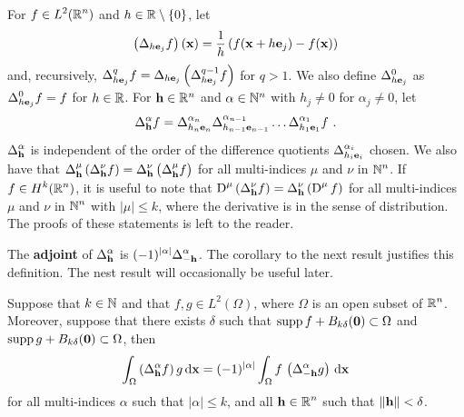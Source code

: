For $\displaystyle f\in L^2(\mathbb{R}^n)$ and $h \in \mathbb{R}\setminus \{0\}$, let
\begin{equation}  \label{ell_diffQuot}
\left(\Delta_{h\mathbf{e}_j} f\right)(\mathbf{x}) =
\frac{1}{h} \left( f(\mathbf{x} + h\mathbf{e}_j) -f(\mathbf{x}) \right)
\end{equation}
and, recursively,
$\displaystyle \Delta_{h\mathbf{e}_j}^q f =
\Delta_{h\mathbf{e}_j} \left(\Delta_{h\mathbf{e}_j}^{q-1} f \right)$
for $q>1$.
We also define $\Delta^0_{h\mathbf{e}_j}$ as
$\displaystyle \Delta^0_{h\mathbf{e}_j} f = f$ for $h \in \mathbb{R}$.
For $\mathbf{h} \in \mathbb{R}^n$ and $\alpha \in \mathbb{N}^n$ with $h_j \neq 0$ for
$\alpha_j \neq 0$, let
\[
\Delta_{\mathbf{h}}^\alpha f = \Delta_{h_n\mathbf{e}_n}^{\alpha_n} 
\Delta_{h_{n-1}\mathbf{e}_{n-1}}^{\alpha_{n-1}} \ldots
\Delta_{h_1\mathbf{e}_1}^{\alpha_1} f \ .
\]
$\displaystyle \Delta_{\mathbf{h}}^\alpha$ is independent of the order of the
difference quotients $\displaystyle \Delta_{h_i\mathbf{e}_i}^{\alpha_i}$ chosen.
We also have that
$\displaystyle \Delta_{\mathbf{h}}^\mu \left( \Delta_{\mathbf{h}}^\nu f\right)
= \Delta_{\mathbf{h}}^\nu \left( \Delta_{\mathbf{h}}^\mu f\right)$ for all
multi-indices $\mu$ and $\nu$ in $\displaystyle \mathbb{N}^n$.
If $\displaystyle f \in H^k(\mathbb{R}^n)$, it is useful to note that
$\displaystyle \operatorname{D}^\mu\left( \Delta_{\mathbf{h}}^\nu f \right)
= \Delta_{\mathbf{h}}^\nu \left(\operatorname{D}^\mu f \right)$ for all
multi-indices $\mu$ and $\nu$ in $\displaystyle \mathbb{N}^n$ with
$|\mu|\leq k$, where the
derivative is in the sense of distribution.  The proofs of these
statements is left to the reader.

The {\bfseries adjoint} of $\displaystyle \Delta_{\mathbf{h}}^\alpha$ is
$\displaystyle (-1)^{|\alpha|}\Delta_{-\mathbf{h}}^\alpha$.  The
corollary to the next result justifies this definition.  The nest
result will occasionally be useful later.

\begin{prop} \label{DiffQuotientAdjoint}
Suppose that $k \in \mathbb{N}$ and that $\displaystyle f,g \in L^2(\Omega)$,
where $\Omega$ is an open subset of $\displaystyle \mathbb{R}^n$.  Moreover,
suppose that there exists $\delta$ such that
$\operatorname{supp} f + B_{k\delta}(\mathbf{0}) \subset \Omega$ and
$\operatorname{supp} g + B_{k\delta}(\mathbf{0}) \subset \Omega$, then
\[
\int_{\Omega} \left(\Delta^\alpha_{\mathbf{h}} f\right) g \,\mathrm{d}{\mathbf{x}}
= (-1)^{|\alpha|}   
\int_{\Omega} f\,\left(\Delta^\alpha_{-\mathbf{h}} g\right) \,\mathrm{d}{\mathbf{x}}
\]
for all multi-indices $\alpha$ such that $|\alpha|\leq k$, and all
$\displaystyle \mathbf{h} \in \mathbb{R}^n$ such that $\|\mathbf{h}\|<\delta$.
\end{prop}

